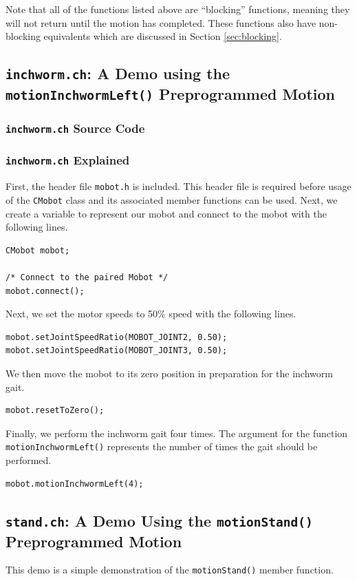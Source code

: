 \documentclass{article}
\begin{document}
Note that all of the functions listed above are ``blocking'' functions, meaning
they will not return until the motion has completed. These functions also
have non-blocking equivalents which are discussed in Section
\ref{sec:blocking}.

\subsection{\texttt{inchworm.ch}: A Demo using the \texttt{motionInchwormLeft()}
Preprogrammed Motion}
\subsubsection{\texttt{inchworm.ch} Source Code}

\subsubsection{\texttt{inchworm.ch} Explained}
First, the header file \texttt{mobot.h} is included. This header file
is required before usage of the \texttt{CMobot} class and its associated
member functions can be used. Next, we create a variable to represent our
mobot and connect to the mobot with the following lines.
\begin{verbatim}
CMobot mobot;

/* Connect to the paired Mobot */
mobot.connect();
\end{verbatim}

Next, we set the motor speeds to 50\% speed with the following lines.
\begin{verbatim}
mobot.setJointSpeedRatio(MOBOT_JOINT2, 0.50);
mobot.setJointSpeedRatio(MOBOT_JOINT3, 0.50);
\end{verbatim}

We then move the mobot to its zero position in preparation for the 
inchworm gait.
\begin{verbatim}
mobot.resetToZero();
\end{verbatim}

Finally, we perform the inchworm gait four times. The argument for the
function \texttt{motionInchwormLeft()} represents the number of times
the gait should be performed.
\begin{verbatim}
mobot.motionInchwormLeft(4);
\end{verbatim}


\subsection{\texttt{stand.ch}: A Demo Using the \texttt{motionStand()} Preprogrammed
Motion}
This demo is a simple demonstration of the \texttt{motionStand()} member function.
\end{document}

